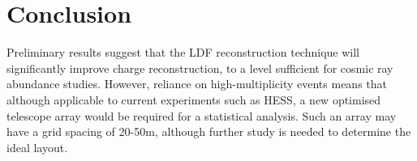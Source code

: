 \documentclass{article}
\begin{document}
\section{Conclusion}
Preliminary results suggest that the LDF reconstruction technique will significantly improve charge reconstruction, to a level sufficient for cosmic ray abundance studies. However, reliance on high-multiplicity events means that although applicable to current experiments such as HESS, a new optimised telescope array would be required for a statistical analysis. Such an array may have a grid spacing of 20-50m, although further study is needed to determine the ideal layout.


\end{document}
